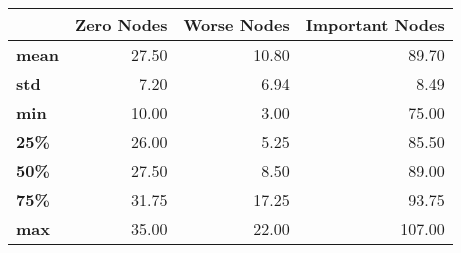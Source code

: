 \begin{tabular}{lrrr}
\toprule
{} &  Zero Nodes &  Worse Nodes &  Important Nodes \\
\midrule
\textbf{mean} &       27.50 &        10.80 &            89.70 \\
\textbf{std } &        7.20 &         6.94 &             8.49 \\
\textbf{min } &       10.00 &         3.00 &            75.00 \\
\textbf{25\% } &       26.00 &         5.25 &            85.50 \\
\textbf{50\% } &       27.50 &         8.50 &            89.00 \\
\textbf{75\% } &       31.75 &        17.25 &            93.75 \\
\textbf{max } &       35.00 &        22.00 &           107.00 \\
\bottomrule
\end{tabular}
